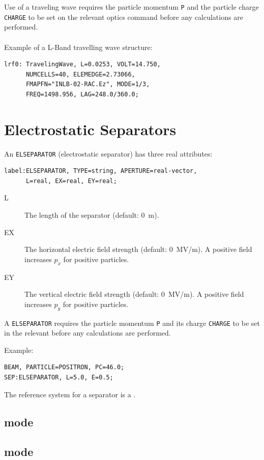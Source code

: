 \noindent Use of a traveling wave requires the particle momentum \texttt{P}
and the particle charge \texttt{CHARGE} to be set on the relevant 
optics command before any calculations are performed.
\\\\
\noindent Example of a L-Band travelling wave structure:
\begin{verbatim}
lrf0: TravelingWave, L=0.0253, VOLT=14.750,
      NUMCELLS=40, ELEMEDGE=2.73066,
      FMAPFN="INLB-02-RAC.Ez", MODE=1/3,
      FREQ=1498.956, LAG=248.0/360.0;
\end{verbatim}

\section{Electrostatic Separators}
\label{sec:separator}
An \texttt{ELSEPARATOR} (electrostatic separator) has three real
attributes:
\begin{verbatim}
label:ELSEPARATOR, TYPE=string, APERTURE=real-vector,
      L=real, EX=real, EY=real;
\end{verbatim}
\begin{description}
\item[L]
  The length of the separator (default: 0~m).
\item[EX]
  The horizontal electric field strength (default: 0~MV/m).
  A positive field increases $p_x$ for positive particles.
\item[EY]
  The vertical electric field strength (default: 0~MV/m).
  A positive field increases $p_y$ for positive particles.
\end{description}
A \texttt{ELSEPARATOR} requires the particle momentum \texttt{P} 
and its charge \texttt{CHARGE} to be set in the relevant
 before any calculations are performed.

\noindent Example:
\begin{verbatim}
BEAM, PARTICLE=POSITRON, PC=46.0;
SEP:ELSEPARATOR, L=5.0, E=0.5;
\end{verbatim}
The reference system for a separator is a 
.
\subsection{\opalt mode}

\subsection{\opalcycl mode}

